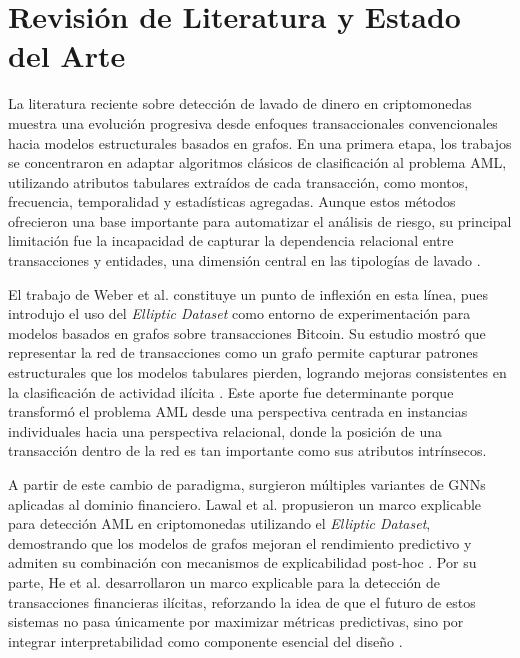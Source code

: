 \bigskip

\section{Revisión de Literatura y Estado del Arte}

La literatura reciente sobre detección de lavado de dinero en criptomonedas muestra una evolución progresiva desde enfoques transaccionales convencionales hacia modelos estructurales basados en grafos. En una primera etapa, los trabajos se concentraron en adaptar algoritmos clásicos de clasificación al problema AML, utilizando atributos tabulares extraídos de cada transacción, como montos, frecuencia, temporalidad y estadísticas agregadas. Aunque estos métodos ofrecieron una base importante para automatizar el análisis de riesgo, su principal limitación fue la incapacidad de capturar la dependencia relacional entre transacciones y entidades, una dimensión central en las tipologías de lavado \cite{Weber2019Anti-MoneyForensics, Unagar2025SurveyXAI}.

\bigskip

El trabajo de Weber et al. constituye un punto de inflexión en esta línea, pues introdujo el uso del \textit{Elliptic Dataset} como entorno de experimentación para modelos basados en grafos sobre transacciones Bitcoin. Su estudio mostró que representar la red de transacciones como un grafo permite capturar patrones estructurales que los modelos tabulares pierden, logrando mejoras consistentes en la clasificación de actividad ilícita \cite{Weber2019Anti-MoneyForensics}. Este aporte fue determinante porque transformó el problema AML desde una perspectiva centrada en instancias individuales hacia una perspectiva relacional, donde la posición de una transacción dentro de la red es tan importante como sus atributos intrínsecos.

\bigskip

A partir de este cambio de paradigma, surgieron múltiples variantes de GNNs aplicadas al dominio financiero. Lawal et al. propusieron un marco explicable para detección AML en criptomonedas utilizando el \textit{Elliptic Dataset}, demostrando que los modelos de grafos mejoran el rendimiento predictivo y admiten su combinación con mecanismos de explicabilidad post-hoc \cite{Lawal2025AnDataset}. Por su parte, He et al. desarrollaron un marco explicable para la detección de transacciones financieras ilícitas, reforzando la idea de que el futuro de estos sistemas no pasa únicamente por maximizar métricas predictivas, sino por integrar interpretabilidad como componente esencial del diseño \cite{He2026AnDetection}.

